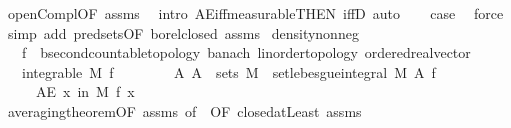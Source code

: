 \begin{isabellebody}
\ open{\isacharunderscore}{\kern0pt}Compl{\isacharbrackleft}{\kern0pt}OF\ assms{\isacharparenleft}{\kern0pt}{}{\isacharparenright}{\kern0pt}{\isacharbrackright}{\kern0pt}\ \isamarkupfalse%
\ {\isacharparenleft}{\kern0pt}intro\ AE{\isacharunderscore}{\kern0pt}iff{\isacharunderscore}{\kern0pt}measurable{\isacharbrackleft}{\kern0pt}THEN\ iffD{}{\isacharbrackright}{\kern0pt}{\isacharcomma}{\kern0pt}\ auto{\isacharparenright}{\kern0pt}\isanewline
\ \ \isamarkupfalse%
\ {\isacharquery}{\kern0pt}case\ \isamarkupfalse%
\ force\isanewline
{}\isamarkupfalse%
\ {\isacharparenleft}{\kern0pt}simp\ add{\isacharcolon}{\kern0pt}\ pred{\isacharunderscore}{\kern0pt}sets{}{\isacharbrackleft}{\kern0pt}OF\ borel{\isacharunderscore}{\kern0pt}closed{\isacharbrackright}{\kern0pt}\ assms{\isacharparenleft}{\kern0pt}{}{\isacharparenright}{\kern0pt}{\isacharparenright}{\kern0pt}%
\endisatagproof
{\isafoldproof}%
%
\isadelimproof
\isanewline
%
\endisadelimproof
\isanewline
{}\isamarkupfalse%
\ density{\isacharunderscore}{\kern0pt}nonneg{\isacharcolon}{\kern0pt}\isanewline
\ \ \ f{\isacharcolon}{\kern0pt}{\isacharcolon}{\kern0pt}{\isachardoublequoteopen}{\isacharunderscore}{\kern0pt}\ {\isasymRightarrow}\ {\isacharprime}{\kern0pt}b{\isacharcolon}{\kern0pt}{\isacharcolon}{\kern0pt}{\isacharbraceleft}{\kern0pt}second{\isacharunderscore}{\kern0pt}countable{\isacharunderscore}{\kern0pt}topology{\isacharcomma}{\kern0pt}\ banach{\isacharcomma}{\kern0pt}\ linorder{\isacharunderscore}{\kern0pt}topology{\isacharcomma}{\kern0pt}\ ordered{\isacharunderscore}{\kern0pt}real{\isacharunderscore}{\kern0pt}vector{\isacharbraceright}{\kern0pt}{\isachardoublequoteclose}\isanewline
\ \ \ {\isachardoublequoteopen}integrable\ M\ f{\isachardoublequoteclose}\ \isanewline
\ \ \ \ \ \ \ {\isachardoublequoteopen}{\isasymAnd}A{\isachardot}{\kern0pt}\ A\ {\isasymin}\ sets\ M\ {\isasymLongrightarrow}\ set{\isacharunderscore}{\kern0pt}lebesgue{\isacharunderscore}{\kern0pt}integral\ M\ A\ f\ {\isasymge}\ {}{\isachardoublequoteclose}\isanewline
\ \ \ \ \ {\isachardoublequoteopen}AE\ x\ in\ M{\isachardot}{\kern0pt}\ f\ x\ {\isasymge}\ {}{\isachardoublequoteclose}\isanewline
%
\isadelimproof
\ \ %
\endisadelimproof
%
\isatagproof
{}\isamarkupfalse%
\ averaging{\isacharunderscore}{\kern0pt}theorem{\isacharbrackleft}{\kern0pt}OF\ assms{\isacharparenleft}{\kern0pt}{}{\isacharparenright}{\kern0pt}{\isacharcomma}{\kern0pt}\ of\ {\isachardoublequoteopen}{\isacharbraceleft}{\kern0pt}{}{\isachardot}{\kern0pt}{\isachardot}{\kern0pt}{\isacharbraceright}{\kern0pt}{\isachardoublequoteclose}{\isacharcomma}{\kern0pt}\ OF\ closed{\isacharunderscore}{\kern0pt}atLeast{\isacharbrackright}{\kern0pt}\ assms{\isacharparenleft}{\kern0pt}{}{\isacharparenright}{\kern0pt}\isanewline

\end{isabellebody}
